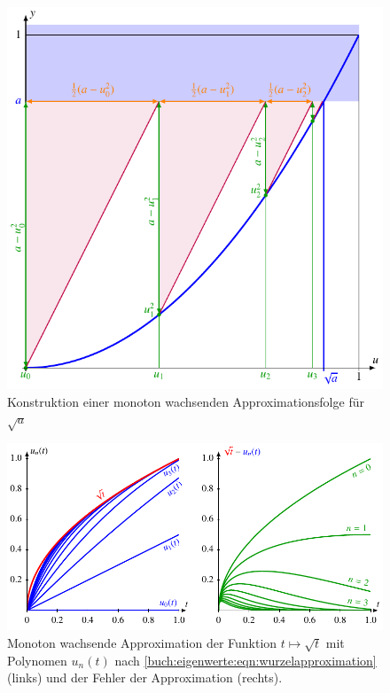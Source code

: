 \begin{figure}
\centering
\includegraphics{chapters/40-eigenwerte/images/wurzel.pdf}
\caption{Konstruktion einer monoton wachsenden Approximationsfolge für
$\sqrt{a}$
\label{buch:eigenwerte:fig:wurzelverfahren}}
\end{figure}

\begin{figure}
\centering
\includegraphics[width=\textwidth]{chapters/40-eigenwerte/images/wurzelapprox.pdf}
\caption{Monoton wachsende Approximation der Funktion $t\mapsto\sqrt{t}$ mit 
Polynomen $u_n(t)$ nach 
\eqref{buch:eigenwerte:eqn:wurzelapproximation}
(links) und der Fehler der Approximation
(rechts).
\label{buch:eigenwerte:fig:wurzelapproximation}}
\end{figure}


